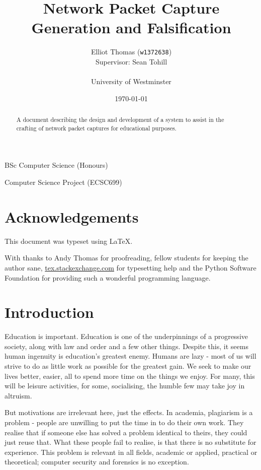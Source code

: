 \documentclass[10pt,a4paper,notitlepage]{report}
\author{Elliot Thomas (\texttt{w1372638})\\ \small Supervisor: Sean Tohill\\ \\ University of Westminster}
\title{Network Packet Capture Generation and Falsification}
\date{\today}
\begin{document}
\maketitle
\begin{center}
BSc Computer Science (Honours)

Computer Science Project (ECSC699)
\end{center}
\begin{abstract}
\begin{center}
A document describing the design and development of a system to assist in the crafting of network packet captures for educational purposes.
\end{center}
\end{abstract}
\let\thefootnote\relax{}
\pagebreak
\listoffigures
\lstlistoflistings
\tableofcontents

\setlength{\parskip}{0.8em}

\pagebreak
\chapter*{Acknowledgements}
\thispagestyle{empty}
This document was typeset using \LaTeX.

With thanks to Andy Thomas for proofreading, fellow students for keeping the author sane, \url{tex.stackexchange.com} for typesetting help and the Python Software Foundation for providing such a wonderful programming language.
\pagebreak
\chapter{Introduction}
Education is important. Education is one of the underpinnings of a progressive society, along with law and order and a few other things.
Despite this, it seems human ingenuity is education's greatest enemy. Humans are lazy - most of us will strive to do as little work as possible for the greatest gain.
We seek to make our lives better, easier, all to spend more time on the things we enjoy. For many, this will be leisure activities, for some, socialising, the humble few may take joy in altruism.

But motivations are irrelevant here, just the effects.
In academia, plagiarism is a problem - people are unwilling to put the time in to do their own work. They realise that if someone else has solved a problem identical to theirs, they could just reuse that.
What these people fail to realise, is that there is no substitute for experience. This problem is relevant in all fields, academic or applied, practical or theoretical; computer security and forensics is no exception.
\end{document}
